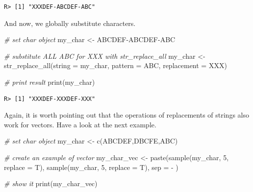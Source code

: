 \documentclass[
  12pt,
]{book}
\newenvironment{Shaded}{\begin{snugshade}}{\end{snugshade}}
\newcommand{\AttributeTok}[1]{\textcolor[rgb]{0.61,0.61,0.61}{#1}}
\newcommand{\CommentTok}[1]{\textcolor[rgb]{0.37,0.37,0.37}{\textit{#1}}}
\newcommand{\DecValTok}[1]{\textcolor[rgb]{0.06,0.06,0.06}{#1}}
\newcommand{\FunctionTok}[1]{\textcolor[rgb]{0,0,0}{#1}}
\newcommand{\NormalTok}[1]{#1}
\newcommand{\OtherTok}[1]{\textcolor[rgb]{0.37,0.37,0.37}{#1}}
\newcommand{\StringTok}[1]{\textcolor[rgb]{0.5,0.5,0.5}{#1}}
\begin{document}
\begin{verbatim}
R> [1] "XXXDEF-ABCDEF-ABC"
\end{verbatim}

And now, we globally substitute characters.

\begin{Shaded}
\begin{Highlighting}[]
\CommentTok{\# set char object}
\NormalTok{my\_char }\OtherTok{\textless{}{-}} \StringTok{\textquotesingle{}ABCDEF{-}ABCDEF{-}ABC\textquotesingle{}}

\CommentTok{\# substitute ALL \textquotesingle{}ABC\textquotesingle{} for \textquotesingle{}XXX\textquotesingle{} with str\_replace\_all}
\NormalTok{my\_char }\OtherTok{\textless{}{-}} \FunctionTok{str\_replace\_all}\NormalTok{(}\AttributeTok{string =}\NormalTok{ my\_char,}
                           \AttributeTok{pattern =} \StringTok{\textquotesingle{}ABC\textquotesingle{}}\NormalTok{,}
                           \AttributeTok{replacement =} \StringTok{\textquotesingle{}XXX\textquotesingle{}}\NormalTok{)}

\CommentTok{\# print result}
\FunctionTok{print}\NormalTok{(my\_char)}
\end{Highlighting}
\end{Shaded}

\begin{verbatim}
R> [1] "XXXDEF-XXXDEF-XXX"
\end{verbatim}

Again, it is worth pointing out that the operations of replacements of strings also work for vectors. Have a look at the next example.

\begin{Shaded}
\begin{Highlighting}[]
\CommentTok{\# set char object}
\NormalTok{my\_char }\OtherTok{\textless{}{-}} \FunctionTok{c}\NormalTok{(}\StringTok{\textquotesingle{}ABCDEF\textquotesingle{}}\NormalTok{,}\StringTok{\textquotesingle{}DBCFE\textquotesingle{}}\NormalTok{,}\StringTok{\textquotesingle{}ABC\textquotesingle{}}\NormalTok{)}

\CommentTok{\# create an example of vector}
\NormalTok{my\_char\_vec }\OtherTok{\textless{}{-}} \FunctionTok{paste}\NormalTok{(}\FunctionTok{sample}\NormalTok{(my\_char, }\DecValTok{5}\NormalTok{, }\AttributeTok{replace =}\NormalTok{ T),}
                     \FunctionTok{sample}\NormalTok{(my\_char, }\DecValTok{5}\NormalTok{, }\AttributeTok{replace =}\NormalTok{ T),}
                     \AttributeTok{sep =} \StringTok{\textquotesingle{} {-} \textquotesingle{}}\NormalTok{)}

\CommentTok{\# show it}
\FunctionTok{print}\NormalTok{(my\_char\_vec)}
\end{Highlighting}
\end{Shaded}
\end{document}
